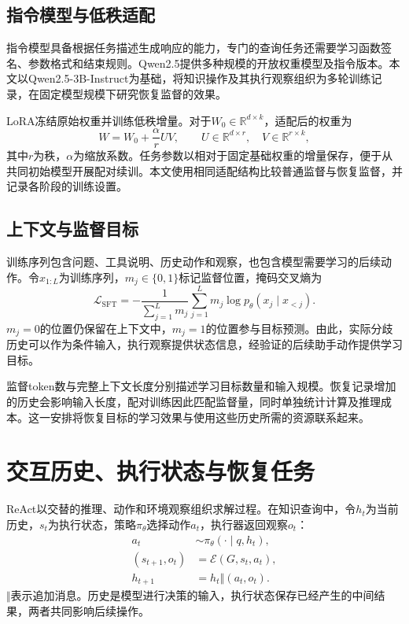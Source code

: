 \subsection{指令模型与低秩适配}

指令模型具备根据任务描述生成响应的能力，专门的查询任务还需要学习函数签名、参数格式和结束规则。Qwen2.5提供多种规模的开放权重模型及指令版本\cite{qwen2024qwen25}。本文以Qwen2.5-3B-Instruct为基础，将知识操作及其执行观察组织为多轮训练记录，在固定模型规模下研究恢复监督的效果。

LoRA冻结原始权重并训练低秩增量\cite{hu2022lora}。对于$W_0\in\mathbb R^{d\times k}$，适配后的权重为
\begin{equation}
 W=W_0+\frac{\alpha}{r}UV,\qquad
 U\in\mathbb R^{d\times r},\quad V\in\mathbb R^{r\times k},
\end{equation}
其中$r$为秩，$\alpha$为缩放系数。任务参数以相对于固定基础权重的增量保存，便于从共同初始模型开展配对续训。本文使用相同适配结构比较普通监督与恢复监督，并记录各阶段的训练设置。

\subsection{上下文与监督目标}

训练序列包含问题、工具说明、历史动作和观察，也包含模型需要学习的后续动作。令$x_{1:L}$为训练序列，$m_j\in\{0,1\}$标记监督位置，掩码交叉熵为
\begin{equation}
 \mathcal L_{\mathrm{SFT}}
 =-\frac{1}{\sum_{j=1}^{L}m_j}
 \sum_{j=1}^{L}m_j\log p_\theta(x_j\mid x_{<j}).
\end{equation}
$m_j=0$的位置仍保留在上下文中，$m_j=1$的位置参与目标预测。由此，实际分歧历史可以作为条件输入，执行观察提供状态信息，经验证的后续助手动作提供学习目标。

监督token数与完整上下文长度分别描述学习目标数量和输入规模。恢复记录增加的历史会影响输入长度，配对训练因此匹配监督量，同时单独统计计算及推理成本。这一安排将恢复目标的学习效果与使用这些历史所需的资源联系起来。

\section{交互历史、执行状态与恢复任务}

ReAct以交替的推理、动作和环境观察组织求解过程\cite{yao2023react}。在知识查询中，令$h_t$为当前历史，$s_t$为执行状态，策略$\pi_\theta$选择动作$a_t$，执行器返回观察$o_t$：
\begin{align}
 a_t&\sim\pi_\theta(\cdot\mid q,h_t),\\
 (s_{t+1},o_t)&=\mathcal E(G,s_t,a_t),\\
 h_{t+1}&=h_t\mathbin{\Vert}(a_t,o_t).
\end{align}
$\Vert$表示追加消息。历史是模型进行决策的输入，执行状态保存已经产生的中间结果，两者共同影响后续操作。

